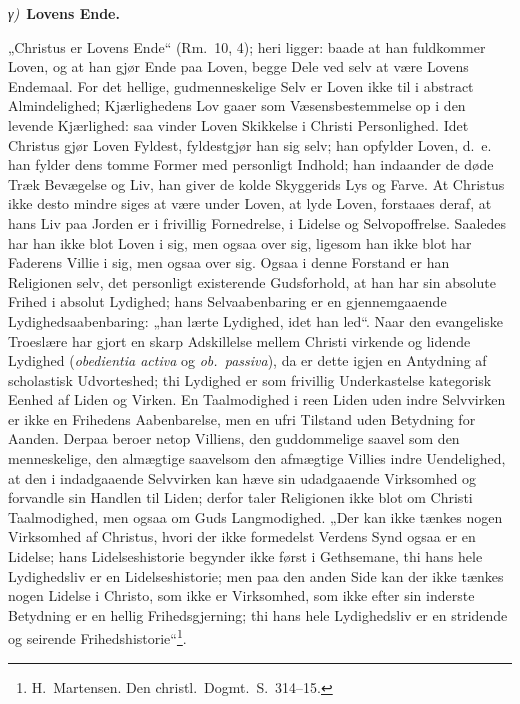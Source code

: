 \documentclass[12pt]{book}
\newcommand{\greekrun}[2]{%
  \medskip\begin{center}{\itshape #1)}\ {\bfseries #2}\end{center}\medskip}
\begin{document}
\greekrun{γ}{Lovens Ende.}

„Christus er Lovens Ende“ (Rm.\ 10, 4); heri ligger: baade at han
fuldkommer Loven, og at han gjør Ende paa Loven, begge Dele ved selv
at være Lovens Endemaal. For det hellige, gudmenneskelige Selv er
Loven ikke til i abstract Almindelighed; Kjærlighedens Lov gaaer som
Væsensbestemmelse op i den levende Kjærlighed: saa vinder Loven
Skikkelse i Christi Personlighed. Idet Christus gjør Loven Fyldest,
fyldestgjør han sig selv; han opfylder Loven, d.\ e. han fylder dens
tomme Former med personligt Indhold; han indaander de døde Træk
Bevægelse og Liv, han giver de kolde Skyggerids Lys og Farve. At
Christus ikke desto mindre siges at være under Loven, at lyde Loven,
forstaaes deraf, at hans Liv paa Jorden er i frivillig Fornedrelse,
i Lidelse og Selvopoffrelse. Saaledes har han ikke blot Loven i sig,
men ogsaa over sig, ligesom han ikke blot har Faderens Villie i sig,
men ogsaa over sig. Ogsaa i denne Forstand er han Religionen selv,
det personligt existerende Gudsforhold, at han har sin absolute
Frihed i absolut Lydighed; hans Selvaabenbaring er en gjennemgaaende
Lydighedsaabenbaring: „han lærte Lydighed, idet han led“. Naar den
evangeliske Troeslære har gjort en skarp Adskillelse mellem Christi
virkende og lidende Lydighed (\textit{obedientia activa} og
\textit{ob.\ passiva}), da er dette igjen en Antydning af
scholastisk Udvorteshed; thi Lydighed er som
frivillig Underkastelse kategorisk Eenhed af Liden og Virken. En
Taalmodighed i reen Liden uden indre Selvvirken er ikke en Frihedens
Aabenbarelse, men en ufri Tilstand uden Betydning for Aanden. Derpaa
beroer netop Villiens, den guddommelige saavel som den menneskelige,
den almægtige saavelsom den afmægtige Villies indre Uendelighed, at
den i indadgaaende Selvvirken kan hæve sin udadgaaende Virksomhed og
forvandle sin Handlen til Liden; derfor taler Religionen ikke blot
om Christi Taalmodighed, men ogsaa om Guds Langmodighed. „Der kan
ikke tænkes nogen Virksomhed af Christus, hvori der ikke formedelst
Verdens Synd ogsaa er en Lidelse; hans Lidelseshistorie begynder
ikke først i Gethsemane, thi hans hele Lydighedsliv er en
Lidelseshistorie; men paa den anden Side kan der ikke tænkes nogen
Lidelse i Christo, som ikke er Virksomhed, som ikke efter sin
inderste Betydning er en hellig Frihedsgjerning; thi hans hele
Lydighedsliv er en stridende og seirende
Frihedshistorie“\footnote{H.\ Martensen. Den christl.\ Dogmt.\
S.\ 314--15.}.
\end{document}
